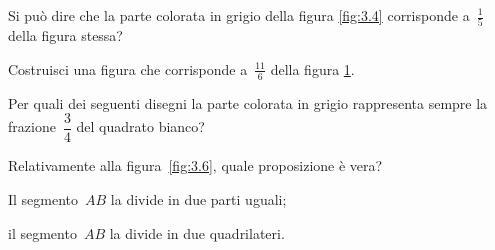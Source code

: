 \begin{figure}[t]
 \begin{minipage}[b]{.45\textwidth}
 \centering
\caption{}\label{fig:3.4}
 \end{minipage}\hfil
\begin{minipage}[b]{.45\textwidth}
 \centering
 \caption{}\label{fig:3.5}
 \end{minipage}
\end{figure}

\begin{esercizio}
 \label{ese:3.13}
Si può dire che la parte colorata in grigio della figura \ref{fig:3.4} corrisponde a~$\frac{1}{5}$ della figura stessa?
\end{esercizio}

\begin{esercizio}
 \label{ese:3.14}
Costruisci una figura che corrisponde a~$\frac{11}{6}$ della figura \ref{fig:3.5}.
\end{esercizio}

\begin{esercizio}
 \label{ese:3.15}
Per quali dei seguenti disegni la parte colorata in grigio rappresenta sempre la frazione~$\dfrac{3}{4}$
del quadrato bianco?
 \begin{center}
 
 \end{center}
\end{esercizio}

\begin{figure}[t]
 \begin{minipage}[b]{.20\textwidth}
 \centering
  \caption{}\label{fig:3.6}
 \end{minipage}\hfil
 \begin{minipage}[b]{.20\textwidth}
 \centering 
  \caption{}\label{fig:3.7}
 \end{minipage}\hfil
 \begin{minipage}[b]{.20\textwidth}
 \centering
  \caption{}\label{fig:3.8}
 \end{minipage}\hfil
 \begin{minipage}[b]{.23\textwidth}
 \centering
  \caption{}\label{fig:3.9}
 \end{minipage}\hfil
\end{figure}

\begin{esercizio}
\label{ese:3.16}
Relativamente alla figura~\ref{fig:3.6}, quale proposizione è vera?

\begin{enumeratea}
\item Il segmento~$AB$ la divide in due parti uguali;
\item il segmento~$AB$ la divide in due quadrilateri.
\end{enumeratea}
\end{esercizio}

